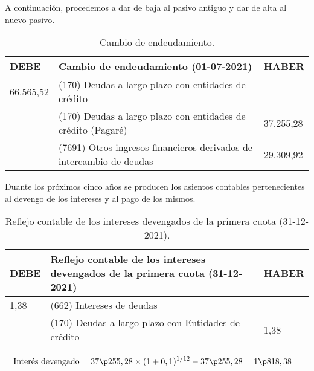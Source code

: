 
A continuación, procedemos a dar de baja al pasivo antiguo y dar de alta al nuevo pasivo.

\begin{table}[H]
    \centering
    \begin{tabular}{|p{2cm}|p{6cm}|p{2cm}|}
    \hline
    \rowcolor{blue!30}
    \textbf{DEBE} & \textbf{Cambio de endeudamiento (01-07-2021)} & \textbf{HABER} \\
    \hline
    66.565,52 & (170) Deudas a largo plazo con entidades de crédito & \\
    \hline
    & (170) Deudas a largo plazo con entidades de crédito (Pagaré) & 37.255,28 \\
    \hline
    & (7691) Otros ingresos financieros derivados de intercambio de deudas & 29.309,92 \\
    \hline
    \end{tabular}
    \caption{Cambio de endeudamiento.}
    \label{tabla:cambio_endeudamiento}
\end{table}

Duante los próximos cinco años se producen los asientos contables pertenecientes al devengo de los intereses y al pago de los mismos.



\begin{table}[H]
    \centering
    \begin{tabular}{|p{2cm}|p{6cm}|p{2cm}|}
        \hline
        \rowcolor{blue!30}
        \textbf{DEBE} & \textbf{Reflejo contable de los intereses devengados de la primera cuota (31-12-2021)} & \textbf{HABER} \\
        \hline
        1\p818,38 & (662) Intereses de deudas & \\
        \hline
        & (170) Deudas a largo plazo con Entidades de crédito & 1\p818,38 \\
        \hline
    \end{tabular}
    \caption{Reflejo contable de los intereses devengados de la primera cuota (31-12-2021).}
    \label{tabla:intereses_2021}
\end{table}

\begin{align*}
    \text{Interés devengado} &= 37\p255,28 \times (1 + 0,1)^{1/12} - 37\p255,28 = 1\p818,38
\end{align*}

